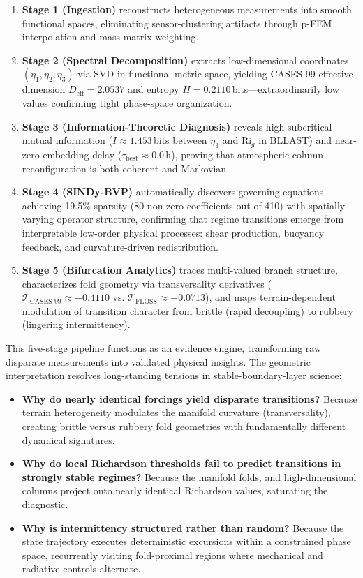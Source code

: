 \documentclass[12pt,a4paper]{article}
\newcommand{\Rig}{\mathrm{Ri}_g}
\begin{document}
\begin{enumerate}
  \item \textbf{Stage 1 (Ingestion)} reconstructs heterogeneous measurements into smooth functional spaces, eliminating sensor-clustering artifacts through p-FEM interpolation and mass-matrix weighting.
  \item \textbf{Stage 2 (Spectral Decomposition)} extracts low-dimensional coordinates $(\eta_1, \eta_2, \eta_3)$ via SVD in functional metric space, yielding CASES-99 effective dimension $D_{\text{eff}} = 2.0537$ and entropy $H = 0.2110$\,bits---extraordinarily low values confirming tight phase-space organization.
  \item \textbf{Stage 3 (Information-Theoretic Diagnosis)} reveals high subcritical mutual information ($I \approx 1.453$\,bits between $\eta_3$ and $\Rig$ in BLLAST) and near-zero embedding delay ($\tau_{\text{best}} \approx 0.0$\,h), proving that atmospheric column reconfiguration is both coherent and Markovian.
  \item \textbf{Stage 4 (SINDy-BVP)} automatically discovers governing equations achieving 19.5\% sparsity (80 non-zero coefficients out of 410) with spatially-varying operator structure, confirming that regime transitions emerge from interpretable low-order physical processes: shear production, buoyancy feedback, and curvature-driven redistribution.
  \item \textbf{Stage 5 (Bifurcation Analytics)} traces multi-valued branch structure, characterizes fold geometry via transversality derivatives ($\mathcal{T}_{\text{CASES-99}} \approx -0.4110$ vs. $\mathcal{T}_{\text{FLOSS}} \approx -0.0713$), and maps terrain-dependent modulation of transition character from brittle (rapid decoupling) to rubbery (lingering intermittency).
\end{enumerate}

This five-stage pipeline functions as an evidence engine, transforming raw disparate measurements into validated physical insights. The geometric interpretation resolves long-standing tensions in stable-boundary-layer science:

\begin{itemize}
  \item \textbf{Why do nearly identical forcings yield disparate transitions?} Because terrain heterogeneity modulates the manifold curvature (transversality), creating brittle versus rubbery fold geometries with fundamentally different dynamical signatures.
  \item \textbf{Why do local Richardson thresholds fail to predict transitions in strongly stable regimes?} Because the manifold folds, and high-dimensional columns project onto nearly identical Richardson values, saturating the diagnostic.
  \item \textbf{Why is intermittency structured rather than random?} Because the state trajectory executes deterministic excursions within a constrained phase space, recurrently visiting fold-proximal regions where mechanical and radiative controls alternate.
\end{itemize}
\end{document}
